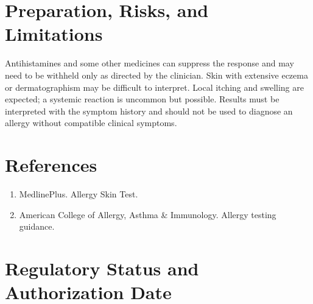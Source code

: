 \section*{Preparation, Risks, and Limitations}
Antihistamines and some other medicines can suppress the response and may need to be withheld only as directed by the clinician. Skin with extensive eczema or dermatographism may be difficult to interpret. Local itching and swelling are expected; a systemic reaction is uncommon but possible. Results must be interpreted with the symptom history and should not be used to diagnose an allergy without compatible clinical symptoms.

\section*{References}
\begin{enumerate}
  \item MedlinePlus. Allergy Skin Test.
  \item American College of Allergy, Asthma \& Immunology. Allergy testing guidance.
\end{enumerate}

\clearpage


\section*{Regulatory Status and Authorization Date}

\clearpage
